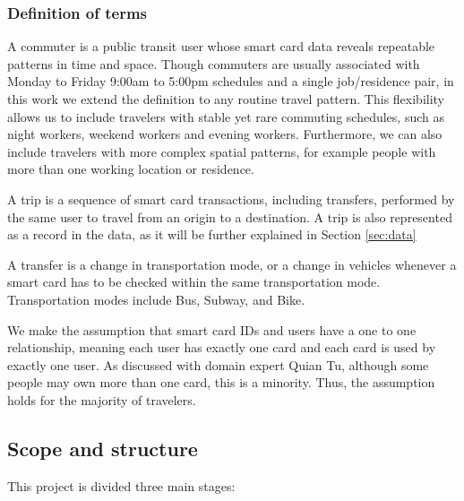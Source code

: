 \documentclass{article}
\begin{document}
\subsubsection{Definition of terms}
A commuter is a public transit user whose smart card data reveals repeatable patterns in time and space. Though commuters are usually associated with Monday to Friday 9:00am to 5:00pm schedules and a single job/residence pair, in this work we extend the definition to any routine travel pattern. This flexibility allows us to include travelers with stable yet rare commuting schedules, such as night workers, weekend workers and evening workers. Furthermore, we can also include travelers with more complex spatial patterns, for example people with more than one working location or residence.  

A trip is a sequence of smart card transactions, including transfers, performed by the same user to travel from an origin to a destination. A trip is also represented as a record in the data, as it will be further explained in Section \ref{sec:data}

A transfer is a change in transportation mode, or a change in vehicles whenever a smart card has to be checked within the same transportation mode. Transportation modes include Bus, Subway, and Bike. 

We make the assumption that smart card IDs and users have a one to one relationship, meaning each user has exactly one card and each card is used by exactly one user. As discussed with domain expert Quian Tu, although some people may own more than one card, this is a minority. Thus, the assumption holds for the majority of travelers. 

\subsection{Scope and structure}
This project is divided three main stages: 
\end{document}
